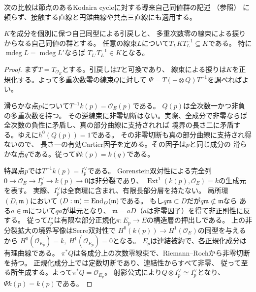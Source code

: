 次の比較は節点のあるKodaira cycleに対する導来自己同値群の記述
（\cite[Proposition~8.40, Corollary~8.41]{Opper2026}参照）
に頼らず、接触する直線と円錐曲線や共点三直線にも適用する。

\begin{lemma}[同じ多重次数のtwistの比較]\label{lem:ou-reduced-md-twist}
$K$を成分を個別に保つ自己同型による引戻しと、
多重次数零の線束による捩りからなる自己同値の群とする。
任意の線束$L$について$T_LKT_L^{-1}\subseteq K$である。
特に$\operatorname{mdeg}L=\operatorname{mdeg}L'$ならば
$T_{L'}T_L^{-1}\in K$となる。
\end{lemma}
\begin{proof}
まず$T=T_{\mathcal O_E}$とする。引戻しは$T$と可換であり、
線束による捩りは$K$を正規化する。よって多重次数零の線束$Q$に対して
$\Psi=T(-\otimes Q)T^{-1}$を調べればよい。

滑らかな点$p$について$T^{-1}k(p)=\mathcal O_E(p)$である。
$Q(p)$は全次数一かつ非負の多重次数を持つ。
その逆線束に非零切断はない。実際、全成分で非零ならば
全次数の負性に矛盾し、真の部分曲線に支持されれば
境界の長さ二に矛盾する。ゆえに$h^0(Q(p))=1$である。
その非零切断も真の部分曲線に支持され得ないので、
長さ一の有効Cartier因子を定める。その因子は$p$と同じ成分の
滑らかな点$q$である。従って$\Psi k(p)=k(q)$である。

特異点$p$では$T^{-1}k(p)=I_p^\vee$である。
Gorenstein双対性による完全列
$0\to\mathcal O_E\to I_p^\vee\to k(p)\to0$は非分裂であり、
$\operatorname{Ext}^1(k(p),\mathcal O_E)=k$の生成元を表す。
実際、$I_p^\vee$は全商環に含まれ、有限長部分層を持たない。
局所環$(D,\mathfrak m)$において
$(D:\mathfrak m)=\operatorname{End}_D(\mathfrak m)$である。
もし$q\mathfrak m\subset D$だが$q\mathfrak m\not\subset\mathfrak m$なら
ある$a\in\mathfrak m$について$qa$が単元となり、
$\mathfrak m=aD$（$a$は非零因子）を得て非正則性に反する。
従って$I_p^\vee$は有限な部分正規化$\pi:E_p\to E$の構造層の押出しである。
上の非分裂拡大の境界写像はSerre双対性で
$H^0(k(p))\to H^1(\mathcal O_E)$の同型を与えるから
$H^0(\mathcal O_{E_p})=k,\ H^1(\mathcal O_{E_p})=0$となる。
$E_p$は連結被約で、各正規化成分は有理曲線である。
$\pi^*Q$は各成分上の次数零線束で、Riemann--Rochから非零切断を持つ。
正規化成分上では定数切断であり、連結性からすべて非零、
従って至る所生成する。よって$\pi^*Q=\mathcal O_{E_p}$。
射影公式により$Q\otimes I_p^\vee\simeq I_p^\vee$となり、
$\Psi k(p)=k(p)$である。


\end{proof}
